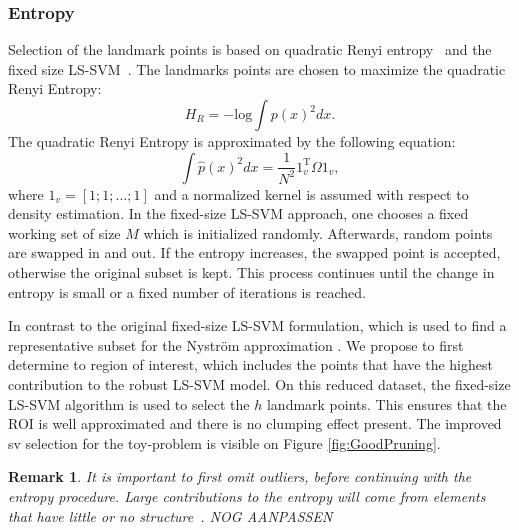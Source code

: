 \documentclass[preprint,12pt]{elsarticle}
\newtheorem*{remark}{Remark}
\begin{document}
\subsubsection{Entropy}
Selection of the landmark points is based on quadratic Renyi entropy~\cite{girolami2002orthogonal} and the fixed size LS-SVM~\cite{suykens2002least}. The landmarks points are chosen to maximize the quadratic Renyi Entropy:
\begin{equation}
H_R = -\mathrm{log}\int p(x)^2 dx.
\end{equation}
The quadratic Renyi Entropy is approximated by the following equation\cite{girolami2002orthogonal}:
\begin{equation}
\int \hat{p}(x)^2dx = \frac{1}{N^2} 1_v^\mathrm{T}\Omega 1_v,
\end{equation}
where $1_v = [1;1;...;1]$ and a normalized kernel is assumed with respect to density estimation. In the fixed-size LS-SVM approach, one chooses a fixed working set of size $M$ which is initialized randomly. Afterwards, random points are swapped in and out. If the entropy increases, the swapped point is accepted, otherwise the original subset is kept. This process continues until the change in entropy is small or a fixed number of iterations is reached. 

In contrast to the original fixed-size LS-SVM formulation, which is used to find a representative subset for the Nystr\"{o}m approximation \cite{suykens2002least}. We propose to first determine to region of interest, which includes the points that have the highest contribution to the robust LS-SVM model. On this reduced dataset, the fixed-size LS-SVM algorithm is used to select the $h$ landmark points. This ensures that the ROI is well approximated and there is no clumping effect present. The improved sv selection for the toy-problem is visible on Figure \ref{fig:GoodPruning}.


\begin{remark}
	It is important to first omit outliers, before continuing with the entropy procedure. Large contributions to the entropy will come from elements that have little or no structure~\cite{girolami2002orthogonal}. NOG AANPASSEN
\end{remark}
\end{document}
